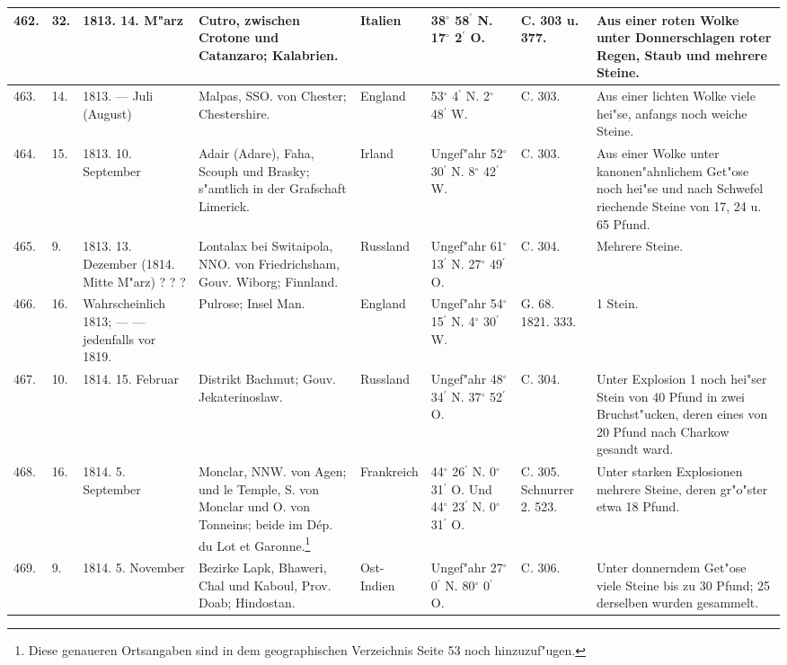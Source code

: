 \documentclass[a4paper, 8pt, oneside, polutonikogreek, german]{article}
\begin{document}
\begin{center}
\begin{longtable}{| p{5mm} | p{3mm} | p{15mm} | p{25mm} | p{20mm} | p{14mm} | p{17mm} | p{24mm} |}
        462. & 32. & 1813. 14. M"arz & Cutro, zwischen Crotone und Catanzaro; Kalabrien. & Italien & 38$^\circ$ 58$^\prime$ N. 17$^\circ$ 2$^\prime$ O. & C. 303 u. 377. & Aus einer roten Wolke unter Donnerschlagen roter Regen, Staub und mehrere Steine. \\ \hline
        463. & 14. & 1813. --- Juli (August) & Malpas, SSO. von Chester; Chestershire. & England & 53$^\circ$ 4$^\prime$ N. 2$^\circ$ 48$^\prime$ W. & C. 303. & Aus einer lichten Wolke viele hei"se, anfangs noch weiche Steine. \\ \hline
        464. & 15. & 1813. 10. September & Adair (Adare), Faha, Scouph und Brasky; s"amtlich in der Grafschaft Limerick. & Irland & Ungef"ahr 52$^\circ$ 30$^\prime$ N. 8$^\circ$ 42$^\prime$ W. & C. 303. & Aus einer Wolke unter kanonen"ahnlichem Get"ose noch hei"se und nach Schwefel riechende Steine von 17, 24 u. 65 Pfund. \\ \hline
        465. & 9. & 1813. 13. Dezember (1814. Mitte M"arz) ? ? ? & Lontalax bei Switaipola, NNO. von Friedrichsham, Gouv. Wiborg; Finnland. & Russland & Ungef"ahr 61$^\circ$ 13$^\prime$ N. 27$^\circ$ 49$^\prime$ O. & C. 304. & Mehrere Steine. \\ \hline
        466. & 16. & Wahrscheinlich 1813; --- --- jedenfalls vor 1819. & Pulrose; Insel Man. & England & Ungef"ahr 54$^\circ$ 15$^\prime$ N. 4$^\circ$ 30$^\prime$ W. & G. 68. 1821. 333. & 1 Stein. \\ \hline
        467. & 10. & 1814. 15. Februar & Distrikt Bachmut; Gouv. Jekaterinoslaw. & Russland & Ungef"ahr 48$^\circ$ 34$^\prime$ N. 37$^\circ$ 52$^\prime$ O. & C. 304. & Unter Explosion 1 noch hei"ser Stein von 40 Pfund in zwei Bruchst"ucken, deren eines von 20 Pfund nach Charkow gesandt ward. \\ \hline
        468. & 16. & 1814. 5. September & Monclar, NNW. von Agen; und le Temple, S. von Monclar und O. von Tonneins; beide im Dép. du Lot et Garonne.\footnote{Diese genaueren Ortsangaben sind in dem geographischen Verzeichnis Seite 53 noch hinzuzuf"ugen.} & Frankreich & 44$^\circ$ 26$^\prime$ N. 0$^\circ$ 31$^\prime$ O. Und 44$^\circ$ 23$^\prime$ N. 0$^\circ$ 31$^\prime$ O. & C. 305. Schnurrer 2. 523. & Unter starken Explosionen mehrere Steine, deren gr"o"ster etwa 18 Pfund. \\ \hline
        469. & 9. & 1814. 5. November & Bezirke Lapk, Bhaweri, Chal und Kaboul, Prov. Doab; Hindostan. & Ost-Indien & Ungef"ahr 27$^\circ$ 0$^\prime$ N. 80$^\circ$ 0$^\prime$ O. & C. 306. & Unter donnerndem Get"ose viele Steine bis zu 30 Pfund; 25 derselben wurden gesammelt. \\ \hline

\end{longtable}
\end{center}
\end{document}
